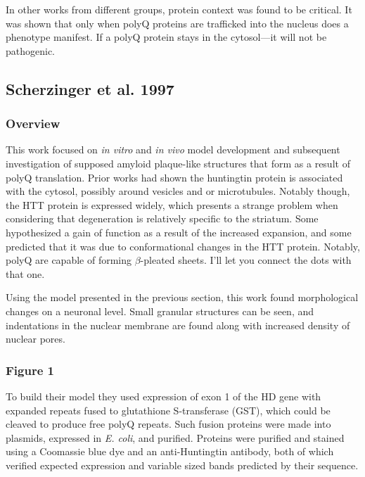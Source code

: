 In other works from different groups, protein context was found to be critical. It was shown that only when polyQ proteins are trafficked into the nucleus does a phenotype manifest. If a polyQ protein stays in the cytosol---it will not be pathogenic.

\subsection*{Scherzinger et al. 1997}

\subsubsection*{Overview}

This work focused on \textit{in vitro} and \textit{in vivo} model development and subsequent investigation of supposed amyloid plaque-like structures that form as a result of polyQ translation. Prior works had shown the huntingtin protein is associated with the cytosol, possibly around vesicles and or microtubules. Notably though, the HTT protein is expressed widely, which presents a strange problem when considering that degeneration is relatively specific to the striatum. Some hypothesized a gain of function as a result of the increased expansion, and some predicted that it was due to conformational changes in the HTT protein. Notably, polyQ are capable of forming $\beta$-pleated sheets. I'll let you connect the dots with that one.\newline

Using the model presented in the previous section, this work found morphological changes on a neuronal level. Small granular structures can be seen, and indentations in the nuclear membrane are found along with increased density of nuclear pores. 

\subsubsection*{Figure 1}

To build their model they used expression of exon 1 of the HD gene with expanded repeats fused to glutathione S-transferase (GST), which could be cleaved to produce free polyQ repeats. Such fusion proteins were made into plasmids, expressed in \textit{E. coli}, and purified. Proteins were purified and stained using a Coomassie blue dye and an anti-Huntingtin antibody, both of which verified expected expression and variable sized bands predicted by their sequence. 

